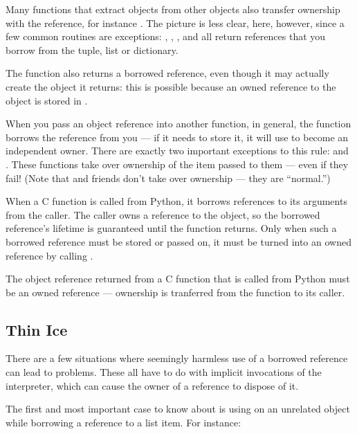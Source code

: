 \documentclass{manual}
\begin{document}
Many functions that extract objects from other objects also transfer
ownership with the reference, for instance
.  The picture is less clear, here,
however, since a few common routines are exceptions:
, ,
, and 
all return references that you borrow from the tuple, list or
dictionary.

The function  also returns a borrowed
reference, even though it may actually create the object it returns:
this is possible because an owned reference to the object is stored in
.

When you pass an object reference into another function, in general,
the function borrows the reference from you --- if it needs to store
it, it will use  to become an independent
owner.  There are exactly two important exceptions to this rule:
 and .  These
functions take over ownership of the item passed to them --- even if
they fail!  (Note that  and friends don't
take over ownership --- they are ``normal.'')

When a C function is called from Python, it borrows references to its
arguments from the caller.  The caller owns a reference to the object,
so the borrowed reference's lifetime is guaranteed until the function
returns.  Only when such a borrowed reference must be stored or passed
on, it must be turned into an owned reference by calling
.

The object reference returned from a C function that is called from
Python must be an owned reference --- ownership is tranferred from the
function to its caller.

\subsection{Thin Ice
            \label{thinIce}}

There are a few situations where seemingly harmless use of a borrowed
reference can lead to problems.  These all have to do with implicit
invocations of the interpreter, which can cause the owner of a
reference to dispose of it.

The first and most important case to know about is using
 on an unrelated object while borrowing a
reference to a list item.  For instance:
\end{document}

